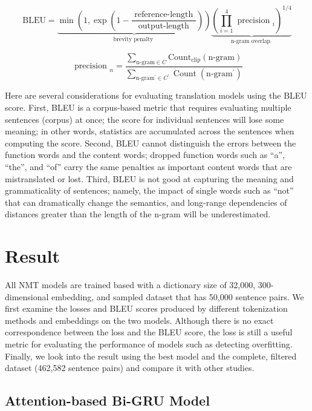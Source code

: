 \begin{equation}
    \mathrm{BLEU}=\underbrace{\min \left(1, \exp \left(1-\frac{\text { reference-length }}{\text { output-length }}\right)\right)}_{\text {brevity penalty }} \underbrace{\left(\prod_{i=1}^{4} \text { precision }_{i}\right)^{1 / 4}}_{\text {n-gram overlap }} \label{eq:eq16}
\end{equation}

\begin{equation}
    \text { precision }_{n} = \frac{\sum_{ \text {n-gram} \in C} \text {Count}_{\text {clip}}(\text {n-gram})}{\sum_{\text{n-gram}^{\prime} \in C^{\prime}} \operatorname{Count}\left(\text{n-gram}^{\prime}\right)} \label{eq:eq17}
\end{equation}

Here are several considerations for evaluating translation models using the BLEU score. First, BLEU is a corpus-based metric that requires evaluating multiple sentences (corpus) at once; the score for individual sentences will lose some meaning; in other words, statistics are accumulated across the sentences when computing the score. Second, BLEU cannot distinguish the errors between the function words and the content words; dropped function words such as ``a'', ``the'', and ``of'' carry the same penalties as important content words that are mistranslated or lost. Third, BLEU is not good at capturing the meaning and grammaticality of sentences; namely, the impact of single words such as ``not'' that can dramatically change the semantics, and long-range dependencies of distances greater than the length of the n-gram will be underestimated.


\section{Result} \label{sec:result}

All NMT models are trained based with a dictionary size of 32,000,
300-dimensional embedding, and sampled dataset that has 50,000 sentence pairs. We first examine the losses and BLEU scores produced by different tokenization methods and embeddings on the two models. Although there is no exact correspondence between the loss and the BLEU score, the loss is still a useful metric for evaluating the performance of models such as detecting overfitting. Finally, we look into the result using the best model and the complete, filtered dataset (462,582 sentence pairs) and compare it with other studies.

\subsection{Attention-based Bi-GRU Model}

